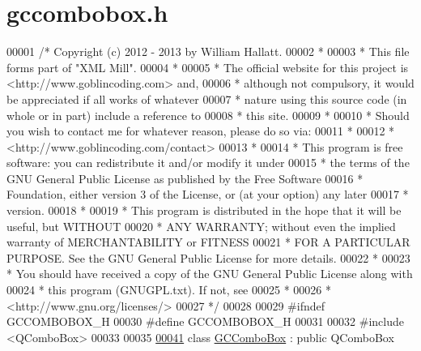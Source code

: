 \hypertarget{gccombobox_8h_source}{\section{gccombobox.\-h}
}

\begin{DoxyCode}
00001 \textcolor{comment}{/* Copyright (c) 2012 - 2013 by William Hallatt.}
00002 \textcolor{comment}{ *}
00003 \textcolor{comment}{ * This file forms part of "XML Mill".}
00004 \textcolor{comment}{ *}
00005 \textcolor{comment}{ * The official website for this project is <http://www.goblincoding.com> and,}
00006 \textcolor{comment}{ * although not compulsory, it would be appreciated if all works of whatever}
00007 \textcolor{comment}{ * nature using this source code (in whole or in part) include a reference to}
00008 \textcolor{comment}{ * this site.}
00009 \textcolor{comment}{ *}
00010 \textcolor{comment}{ * Should you wish to contact me for whatever reason, please do so via:}
00011 \textcolor{comment}{ *}
00012 \textcolor{comment}{ *                 <http://www.goblincoding.com/contact>}
00013 \textcolor{comment}{ *}
00014 \textcolor{comment}{ * This program is free software: you can redistribute it and/or modify it
       under}
00015 \textcolor{comment}{ * the terms of the GNU General Public License as published by the Free
       Software}
00016 \textcolor{comment}{ * Foundation, either version 3 of the License, or (at your option) any later}
00017 \textcolor{comment}{ * version.}
00018 \textcolor{comment}{ *}
00019 \textcolor{comment}{ * This program is distributed in the hope that it will be useful, but WITHOUT}
00020 \textcolor{comment}{ * ANY WARRANTY; without even the implied warranty of MERCHANTABILITY or
       FITNESS}
00021 \textcolor{comment}{ * FOR A PARTICULAR PURPOSE.  See the GNU General Public License for more
       details.}
00022 \textcolor{comment}{ *}
00023 \textcolor{comment}{ * You should have received a copy of the GNU General Public License along with}
00024 \textcolor{comment}{ * this program (GNUGPL.txt).  If not, see}
00025 \textcolor{comment}{ *}
00026 \textcolor{comment}{ *                    <http://www.gnu.org/licenses/>}
00027 \textcolor{comment}{ */}
00028 
00029 \textcolor{preprocessor}{#ifndef GCCOMBOBOX\_H}
00030 \textcolor{preprocessor}{}\textcolor{preprocessor}{#define GCCOMBOBOX\_H}
00031 \textcolor{preprocessor}{}
00032 \textcolor{preprocessor}{#include <QComboBox>}
00033 
00035 
\hypertarget{gccombobox_8h_source_l00041}{}\hyperlink{class_g_c_combo_box}{00041} \textcolor{keyword}{class }\hyperlink{class_g_c_combo_box}{GCComboBox} : \textcolor{keyword}{public} QComboBox

\end{DoxyCode}
